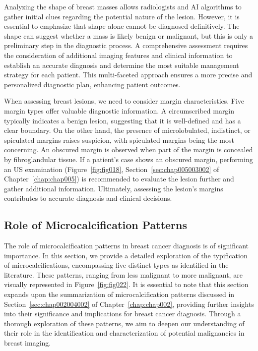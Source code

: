 Analyzing the shape of breast masses allows radiologists and \ac{AI} algorithms to gather initial clues regarding the potential nature of the lesion.
However, it is essential to emphasize that shape alone cannot be diagnosed definitively.
The shape can suggest whether a mass is likely benign or malignant, but this is only a preliminary step in the diagnostic process.
A comprehensive assessment requires the consideration of additional imaging features and clinical information to establish an accurate diagnosis and determine the most suitable management strategy for each patient.
This multi-faceted approach ensures a more precise and personalized diagnostic plan, enhancing patient outcomes.

When assessing breast lesions, we need to consider margin characteristics.
Five margin types offer valuable diagnostic information.
A circumscribed margin typically indicates a benign lesion, suggesting that it is well-defined and has a clear boundary.
On the other hand, the presence of microlobulated, indistinct, or spiculated margins raises suspicion, with spiculated margins being the most concerning.
An obscured margin is observed when part of the margin is concealed by fibroglandular tissue.
If a patient's case shows an obscured margin, performing an \ac{US} examination \textcolor{revised}{(Figure~\ref{fig:fig018}, Section~\ref{sec:chap005003002} of Chapter~\ref{chap:chap005})} is recommended to evaluate the lesion further and gather additional information.
Ultimately, assessing the lesion's margins contributes to accurate diagnosis and clinical decisions.

\subsection{Role of Microcalcification Patterns}
\label{sec:app001004002}

The role of microcalcification patterns in breast cancer diagnosis is of significant importance.
In this section, we provide a detailed exploration of the typification of microcalcifications, encompassing five distinct types as identified in the literature.
These patterns, ranging from less malignant to more malignant, are visually represented in Figure~\ref{fig:fig022}.
It is essential to note that this section expands upon the summarization of microcalcification patterns discussed in Section~\ref{sec:chap002004002} of Chapter~\ref{chap:chap002}, providing further insights into their significance and implications for breast cancer diagnosis.
Through a thorough exploration of these patterns, we aim to deepen our understanding of their role in the identification and characterization of potential malignancies in breast imaging.

